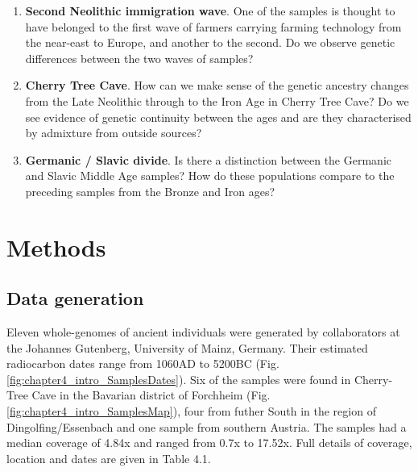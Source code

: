 \begin{enumerate}
\item \textbf{Second Neolithic immigration wave}. One of the samples is thought to have belonged to the first wave of farmers carrying farming technology from the near-east to Europe, and another to the second. Do we observe genetic differences between the two waves of samples?
\item \textbf{Cherry Tree Cave}. How can we make sense of the genetic ancestry changes from the Late Neolithic through to the Iron Age in Cherry Tree Cave? Do we see evidence of genetic continuity between the ages and are they characterised by admixture from outside sources?
\item \textbf{Germanic / Slavic divide}. Is there a distinction between the Germanic and Slavic Middle Age samples? How do these populations compare to the preceding samples from the Bronze and Iron ages?
\end{enumerate}

\section{Methods}

\subsection{Data generation}

Eleven whole-genomes of ancient individuals were generated by collaborators at the Johannes Gutenberg, University of Mainz, Germany. Their estimated radiocarbon dates range from 1060AD to 5200BC (Fig. \ref{fig:chapter4_intro_SamplesDates}). Six of the samples were found in Cherry-Tree Cave in the Bavarian district of Forchheim (Fig. \ref{fig:chapter4_intro_SamplesMap}), four from futher South in the region of Dingolfing/Essenbach and one sample from southern Austria. The samples had a median coverage of 4.84x and ranged from 0.7x to 17.52x. Full details of coverage, location and dates are given in Table 4.1.

